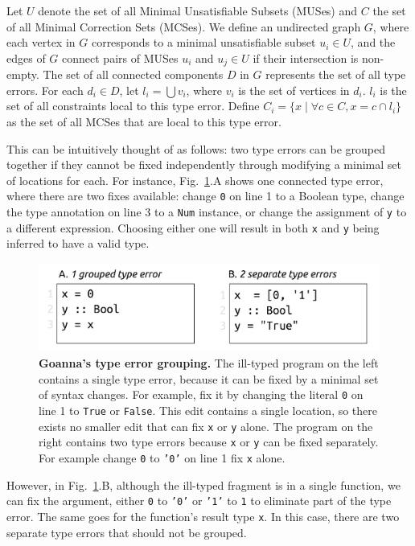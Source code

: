 \documentclass[pdflatex,lineno,sn-nature,Numbered]{sn-jnl}%
\begin{document}
	Let $U$ denote the set of all Minimal Unsatisfiable Subsets (MUSes) and $C$ the set of all Minimal Correction Sets (MCSes). We define an undirected graph $G$, where each vertex in $G$ corresponds to a minimal unsatisfiable subset $u_i \in U$, and the edges of $G$ connect pairs of MUSes $u_i$ and $u_j \in U$ if their intersection is non-empty. The set of all connected components $D$ in $G$ represents the set of all type errors. For each $d_i \in D$, let $l_i = \bigcup v_i$, where $v_i$ is the set of vertices in $d_i$. $l_i$ is the set of all constraints local to this type error. Define $C_i = \{ x \mid \forall c \in C, x = c \cap l_i \}$ as the set of all MCSes that are local to this type error.


    This can be intuitively thought of as follows: two type errors can be grouped together if they cannot be fixed independently through modifying a minimal set of locations for each. For instance, Fig.~\ref{fig:grouping-example}.A shows one connected type error, where there are two fixes available: change \texttt{0} on line 1 to a Boolean type, change the type annotation on line 3 to a \texttt{Num} instance, or change the assignment of \texttt{y} to a different expression. Choosing either one will result in both \texttt{x} and \texttt{y} being inferred to have a valid type.
    

   \begin{figure}[ht!]
        \centering
        \includegraphics[width=0.8\linewidth]{images/Grouping-Example}
        \caption[Goanna's type error grouping]{\textbf{Goanna's type error grouping.} The ill-typed program on the left contains a single type error, because it can be fixed by a minimal set of syntax changes. For example, fix it by changing the literal \texttt{0} on line 1 to \texttt{True} or \texttt{False}. This edit contains a single location, so there exists no smaller edit that can fix \texttt{x} or \texttt{y} alone. The program on the right contains two type errors because \texttt{x} or \texttt{y} can be fixed separately. For example change \texttt{0} to \texttt{'0'} on line 1 fix \texttt{x} alone. }
        \label{fig:grouping-example}
    \end{figure}


    However, in Fig.~\ref{fig:grouping-example}.B, although the ill-typed fragment is in a single function, we can fix the argument, either \texttt{0} to \texttt{'0'} or \texttt{'1'} to \texttt{1} to eliminate part of the type error. The same goes for the function's result type \texttt{x}. In this case, there are two separate type errors that should not be grouped.
\end{document}
